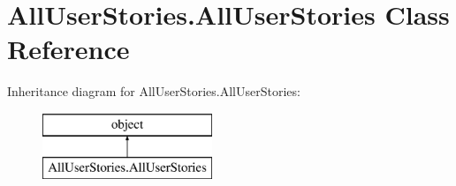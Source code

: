 \hypertarget{class_all_user_stories_1_1_all_user_stories}{}\section{All\+User\+Stories.\+All\+User\+Stories Class Reference}
\label{class_all_user_stories_1_1_all_user_stories}
Inheritance diagram for All\+User\+Stories.\+All\+User\+Stories\+:\begin{figure}[H]
\begin{center}
\leavevmode
\includegraphics[height=2.000000cm]{class_all_user_stories_1_1_all_user_stories}
\end{center}
\end{figure}
